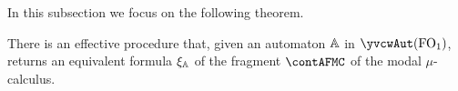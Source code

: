 
%
%

In this subsection we focus on the following theorem.

\begin{theorem}\label{t:autofor}
There is an effective procedure that, given an automaton $\mathbb{A}$ in
$\yvcwAut(\ofo)$, returns an equivalent formula $\xi_{\mathbb{A}}$ of the fragment 
$\contAFMC$ of the modal $\mu$-calculus.
\end{theorem}

